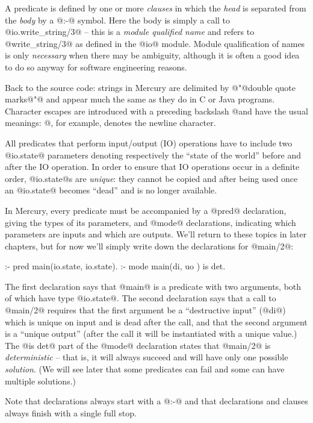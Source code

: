 A predicate is defined by one or more \emph{clauses} in which the
\emph{head} is separated from the \emph{body} by a @:-@ symbol.  Here
the body is simply a call to @io.write_string/3@ -- this is a
\emph{module qualified name} and refers to @write_string/3@ as defined
in the @io@ module.  Module qualification of names is only
\emph{necessary} when there may be ambiguity, although it is often a
good idea to do so anyway for software engineering reasons.

Back to the source code: strings in Mercury are delimited by @"@double
quote marks@"@ and appear much the same as they do in C or Java
programs.  Character escapes are introduced with a preceding backslash
@\@ and have the usual meanings: @\n@, for example, denotes the newline
character.

All predicates that perform input/output (IO) operations have to include
two @io.state@ parameters denoting respectively the ``state of the
world'' before and after the IO operation.  In order to ensure that IO
operations occur in a definite order, @io.state@s are \emph{unique}:
they cannot be copied and after being used once an @io.state@ becomes
``dead'' and is no longer available.

In Mercury, every predicate must be accompanied by a @pred@ declaration,
giving the types of its parameters, and @mode@ declarations, indicating
which parameters are inputs and which are outputs.  We'll return to
these topics in later chapters, but for now we'll simply write down the
declarations for @main/2@:
\begin{myverbatim}
:- pred main(io.state, io.state).
:- mode main(di,       uo      ) is det.
\end{myverbatim}
The first declaration says that @main@ is a predicate with two
arguments, both of which have type @io.state@.  The second declaration
says that a call to @main/2@ requires that the first argument be a
``destructive input'' (@di@) which is unique on input and is dead
after the call, and that the second argument is a ``unique
output'' (\ie after the call it will be instantiated with a unique value.)
The @is det@ part of the @mode@ declaration states that @main/2@ is
\emph{deterministic} -- that is, it will always succeed and will have
only one possible \emph{solution}.  (We will see later that some
predicates can fail and some can have multiple solutions.)

Note that declarations always start with a @:-@ and that declarations
and clauses always finish with a single full stop.

